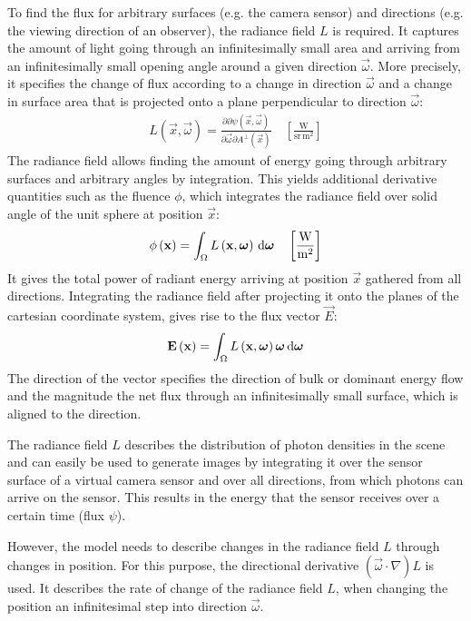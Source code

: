 To find the flux for arbitrary surfaces (e.g. the camera sensor) and directions (e.g. the viewing direction of an observer), the radiance field $L$ is required. It captures the amount of light going through an infinitesimally small area and arriving from an infinitesimally small opening angle around a given direction $\vec{\omega}$. More precisely, it specifies the change of flux according to a change in direction $\vec{\omega}$ and a change in surface area that is projected onto a plane perpendicular to direction $\vec{\omega}$:
\begin{align*}
L\left(\vec{x}, \vec{\omega}\right) = \frac{\partial\partial\psi\left(\vec{x}, \vec{\omega}\right)}{\partial\vec{\omega}\partial A^\perp\left(\vec{x}\right)}
\quad
\left[\frac{\si{\watt}}{\si{\steradian}\, \si{\meter}^2}\right]
\end{align*}
The radiance field allows finding the amount of energy going through arbitrary surfaces and arbitrary angles by integration. This yields additional derivative quantities such as the fluence $\phi$, which integrates the radiance field over solid angle of the unit sphere at position $\vec{x}$:
\begin{align*}
\phi\left(\boldsymbol{\mathbf{x}}\right) = \int_\Omega L\left(\boldsymbol{\mathbf{x}}, \boldsymbol{\mathbf{\omega}}\right) \,\mathrm{d}\boldsymbol{\mathbf{\omega}}
\quad
\left[\frac{\si{\watt}}{\si{\meter}^2}\right]
\end{align*}
It gives the total power of radiant energy arriving at position $\vec{x}$ gathered from all directions. Integrating the radiance field after projecting it onto the planes of the cartesian coordinate system, gives rise to the flux vector $\vec{E}$:
\begin{align*}
\boldsymbol{\mathbf{E}}\left(\boldsymbol{\mathbf{x}}\right) = \int_\Omega L\left(\boldsymbol{\mathbf{x}}, \boldsymbol{\mathbf{\omega}}\right)\boldsymbol{\mathbf{\omega}} \,\mathrm{d}\boldsymbol{\mathbf{\omega}}
\end{align*}
The direction of the vector specifies the direction of bulk or dominant energy flow and the magnitude the net flux through an infinitesimally small surface, which is aligned to the direction.

The radiance field $L$ describes the distribution of photon densities in the scene and can easily be used to generate images by integrating it over the sensor surface of a virtual camera sensor and over all directions, from which photons can arrive on the sensor. This results in the energy that the sensor receives over a certain time (flux $\psi$).


However, the model needs to describe changes in the radiance field $L$ through changes in position. For this purpose, the directional derivative $\left(\vec{\omega}\cdot\nabla\right)L$ is used. It describes the rate of change of the radiance field $L$, when changing the position an infinitesimal step into direction $\vec{\omega}$.

